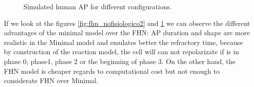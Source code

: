 \begin{figure}[!htbp]
	\centering
	\caption{Simulated human AP for different configurations.} \label{fig:mde_min_ex1_single-cell}
\end{figure}	

If we look at the figures \ref{fig:fhn_nofisiologico2} and \ref{fig:mde_min_ex1_single-cell} we can observe the different advantages of the minimal model over the FHN: AP duration and shape are more realistic in the Minimal model and emulates better the refractory time, because by construction of the reaction model, the cell will can not repolarizate if is in phase 0, phase1, phase 2 or the beginning of phase 3. On the other hand, the FHN model is cheaper regards to computational cost but not enough to considerate FHN over Minimal. 

